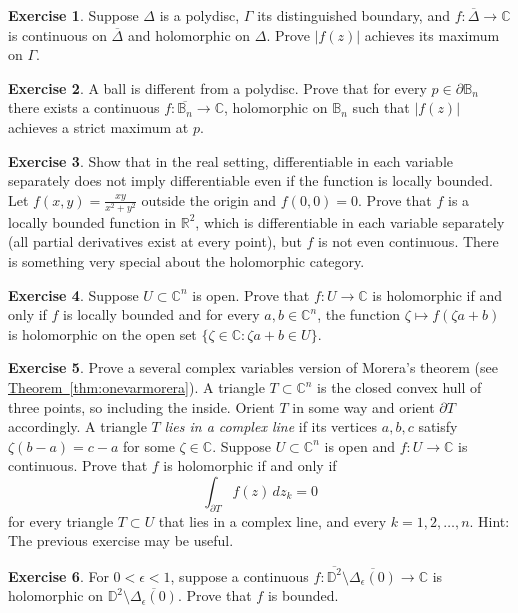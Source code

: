 \documentclass[12pt,openany]{book}
\newcommand{\sabs}[1]{\lvert {#1} \rvert}
\newcommand{\C}{{\mathbb{C}}}
\newcommand{\R}{{\mathbb{R}}}
\newcommand{\D}{{\mathbb{D}}}
\newcommand{\bB}{{\mathbb{B}}}
\theoremstyle{plain}
\theoremstyle{remark}
\theoremstyle{definition}
\newenvironment{exbox}{%
    \def\FrameCommand{\vrule width 1pt \relax\hspace{10pt}}%
    \MakeFramed {\advance \hsize -\width \FrameRestore}%
}{%
    \endMakeFramed
}
\theoremstyle{exercise}
\newtheorem{exercise}{Exercise}[section]
\theoremstyle{example}
\newcommand{\thmref}[1]{\hyperref[#1]{Theorem~\ref*{#1}}}
\begin{document}
\begin{exbox}
\begin{exercise}
Suppose $\Delta$ is a polydisc, $\Gamma$ its distinguished boundary,
and $f \colon \overline{\Delta} \to \C$ is continuous on $\overline{\Delta}$
and holomorphic on $\Delta$.
Prove
$\sabs{f(z)}$ achieves its maximum on $\Gamma$.
\end{exercise}

\begin{exercise}
A ball is different from a polydisc.  Prove that for every $p \in \partial \bB_n$
there exists a continuous $f \colon \overline{\bB_n} \to \C$, holomorphic
on $\bB_n$ such that $\sabs{f(z)}$ achieves a strict maximum at $p$.
\end{exercise}

\begin{exercise}
Show that in the real setting, differentiable
in each variable separately does not imply differentiable even if
the function is locally bounded.
Let $f(x,y) = \frac{xy}{x^2+y^2}$ outside the origin
and $f(0,0) = 0$.  Prove that $f$ is a
locally bounded function in $\R^2$, which is differentiable
in each variable separately (all partial derivatives exist at every point), but 
$f$ is not even continuous.  There is something very
special about the holomorphic category.
\end{exercise}

\begin{exercise}
Suppose $U \subset \C^n$ is open.
Prove that $f \colon U \to \C$ is holomorphic if and only if
$f$ is locally bounded and
for every $a,b \in \C^n$, the
function
$\zeta \mapsto f(\zeta a + b)$ is holomorphic on
the open set $\{ \zeta \in \C : \zeta a + b \in U \}$.
\end{exercise}

\begin{exercise}
Prove a several complex variables version of Morera's theorem (see
\thmref{thm:onevarmorera}).
A triangle $T \subset \C^n$ is the closed convex hull of three points, so
including the inside.  Orient $T$ in some way %
and orient $\partial T$ accordingly.
A triangle $T$ \emph{lies in a complex line} if
its vertices $a,b,c$ satisfy
$\zeta (b-a) = c-a$ for some $\zeta \in \C$.
Suppose $U \subset \C^n$ is open and $f \colon U \to \C$ is continuous.
Prove that $f$ is holomorphic if and only if
\begin{equation*}
\int_{\partial T} f(z) \, dz_k = 0
\end{equation*}
for every triangle $T \subset U$ that lies in a complex line,
and every $k=1,2,\ldots,n$.
Hint: The previous exercise may be useful.
\end{exercise}

\begin{exercise}
For $0 < \epsilon < 1$,
suppose a continuous
$f \colon \overline{\D^2} \setminus \overline{\Delta_\epsilon(0)} \to \C$ is holomorphic
on $\D^2 \setminus \overline{\Delta_\epsilon(0)}$.
Prove that $f$ is bounded.
\end{exercise}
\end{exbox}
\end{document}
